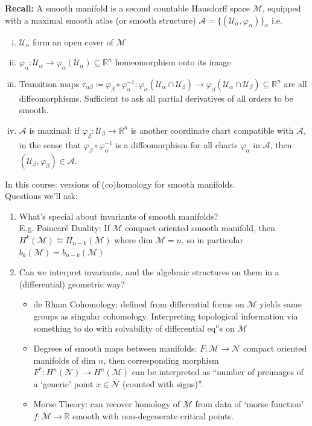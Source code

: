 \documentclass[10pt]{article}
\theoremstyle{plain}
\theoremstyle{definition}
\newcommand{\Recall}{\textbf{Recall: }}
\newcommand{\Real}{\mathbb{R}}
\newcommand{\man}{\mathcal{M}}
\newcommand{\nan}{\mathcal{N}}
\newcommand{\chartU}{\mathcal{U}}
\newcommand{\chart}{\varphi}
\newcommand{\Atlas}{\mathcal{A}}
\begin{document}
\Recall A smooth manifold is a second countable Hausdorff space $\mathcal{M}$, equipped with a maximal smooth atlas (or smooth structure) $\mathcal{A} = \{(\mathcal{U}_{\alpha},\varphi_{\alpha})\}_{\alpha} $ i.e.
\begin{enumerate}[(i)]
    \item $\mathcal{U}_{\alpha}$ form an open cover of $\mathcal{M}$
    \item $\varphi_{\alpha} : \chartU_{\alpha} \to \varphi_{\alpha}(\mathcal{U}_{\alpha}) \subseteq \Real^n$ homeomorphism onto its image
    \item Transition maps $\tau_{\alpha\beta} \coloneqq \chart_{\beta} \circ \chart_{\alpha}^{-1} : \chart_{\alpha}(\chartU_{\alpha}\cap\chartU_{\beta}) \to \chart_{\beta}(\chartU_{\alpha}\cap\chartU_{\beta}) \subseteq \Real^n$ are all diffeomorphisms. Sufficient to ask all partial derivatives of all orders to be smooth.
    \item $\Atlas$ is maximal: if $\chart_{\beta} : \chartU_{\beta} \to \Real^n$ is another coordinate chart compatible with $\Atlas$, in the sense that $\chart_{\beta} \circ \chart_{\alpha} ^{-1}$ is a diffeomorphism for all charts $\chart_{\alpha}$ in $\Atlas$, then $(\chartU_{\beta},\chart_{\beta}) \in \Atlas$. 
\end{enumerate}
In this course: versions of (co)homology for smooth manifolds. \\Questions we'll ask:
\begin{enumerate}
    \item What's special about invariants of smooth manifolds?\\ E.g. Poincar\'e Duality: If $\man$ compact oriented smooth manifold, then $H^k(\man) \cong H_{n-k}(\man)$ where dim $\man = n$, so in particular $b_k(\man) = b_{n-k}(\man)$
    \item Can we interpret invariants, and the algebraic structures on them in a (differential) geometric way? \begin{itemize}
        \item  de Rham Cohomology: defined from differential forms on $\man$ yields same groups as singular cohomology. Interpreting topological information via something to do with solvability of differential eq$^n$s on $\man$
        \item  Degrees of smooth maps between manifolds: $F : \man\to\nan$ compact oriented manifolds of dim $n$, then corresponding morphism $F^* : H^n(\nan)\to H^n(\man)$ can be interpreted as ``number of preimages of a `generic' point $x\in \nan$ (counted with signs)''.
        \item Morse Theory: can recover homology of $\man$ from data of `morse function' $f : \man \to \Real$ smooth with non-degenerate critical points.
    \end{itemize}
\end{enumerate}
\end{document}

